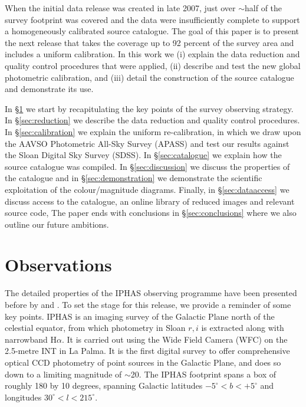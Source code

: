 \documentclass[useAMS,usenatbib]{mn2e}
\begin{document}
When the initial data release was created in late 2007,
just over $\sim$half of the survey footprint was covered
and the data were insufficiently complete 
to support a homogeneously calibrated source catalogue.
The goal of this paper is to present the next release 
that takes the coverage up to 92 percent of the survey area 
and includes a uniform calibration.
In this work we
(i) explain the data reduction 
and quality control procedures that were applied,
(ii) describe and test the new global photometric calibration, and 
(iii) detail the construction of the source catalogue
and demonstrate its use.

In \S\ref{sec:observations} we start by recapitulating the key points
of the survey observing strategy.
In \S\ref{sec:reduction} we describe the data reduction
and quality control procedures.
In \S\ref{sec:calibration} we explain the uniform re-calibration, in which
we draw upon the AAVSO Photometric All-Sky Survey (APASS)
and test our results against the Sloan Digital Sky Survey (SDSS).
In \S\ref{sec:catalogue} we explain how the source catalogue was compiled.
In \S\ref{sec:discussion} we discuss the properties of the catalogue
and in \S\ref{sec:demonstration} we demonstrate
the scientific exploitation of the colour/magnitude diagrams.
Finally, in \S\ref{sec:dataaccess} we discuss access
to the catalogue, an online library of reduced images and relevant source code,
The paper ends with conclusions in \S\ref{sec:conclusions} where we also outline
our future ambitions.

\section{Observations}
\label{sec:observations}

The detailed properties of the IPHAS observing programme 
have been presented before 
by \citet{Drew2005} and \citet{Gonzalez-Solares2008}. 
To set the stage for this release, we provide a reminder of some key points.
IPHAS is an imaging survey of the Galactic Plane north of the celestial equator, 
from which photometry in Sloan $r, i$ 
is extracted along with narrowband H$\alpha$. 
It is carried out using the Wide Field Camera (WFC) 
on the 2.5-metre INT in La Palma. 
It is the first digital survey to offer comprehensive optical CCD photometry
of point sources in the Galactic Plane, 
and does so down to a limiting magnitude of $\sim$20.
The IPHAS footprint spans a box 
of roughly 180 by 10 degrees, 
spanning Galactic latitudes $-5^{\circ} < b < +5^{\circ}$ 
and longitudes $30^{\circ} < l < 215^{\circ}$.
\end{document}

